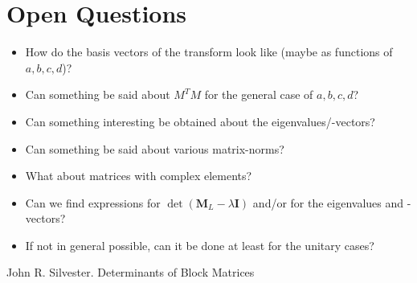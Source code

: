 \section{Open Questions}
\begin{itemize}
	\item How do the basis vectors of the transform look like (maybe as functions of $a,b,c,d$)? 
	\item Can something be said about $M^T M$ for the general case of $a,b,c,d$?
	\item Can something interesting be obtained about the eigenvalues/-vectors? 
	\item Can something be said about various matrix-norms?
	\item What about matrices with complex elements?
	\item Can we find expressions for $\det(\mathbf{M}_L - \lambda \mathbf{I})$ and/or for the eigenvalues and -vectors?
	\item If not in general possible, can it be done at least for the unitary cases?	
\end{itemize}



























\begin{thebibliography}{9}  %
  John R. Silvester. Determinants of Block Matrices 
\end{thebibliography}

